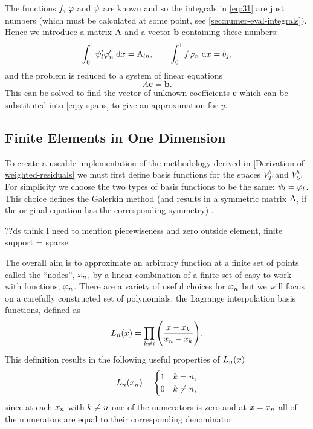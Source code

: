 The functions $f$, $\varphi$ and $\psi$ are known and so the integrals in \eqref{eq:31} are just numbers (which must be calculated at some point, see \autoref{sec:numer-eval-integrals}).
Hence we introduce a matrix $\mathrm{A}$ and a vector $\mathbf{b}$ containing these numbers:
\begin{equation}
  {\int_0^1  \psi_{l}'\varphi'_{n}  {\; \text{d}}{x}} =\mathrm{A}_{ln},\qquad{\int_0^1  f\varphi_{n}  {\; \text{d}}{x}} =b_{j},\label{eq:Aij_bj}
\end{equation}
and the problem is reduced to a system of linear equations
\begin{equation}
  A\mathbf{c} = \mathbf{b}.
  \label{eq:final_galerkin}
\end{equation}
This can be solved to find the vector of unknown coefficients $\mathbf{c}$ which can be substituted into \eqref{eq:y-spans} to give an approximation for $y$.


\subsection{Finite Elements in One Dimension}
\label{sub:Actual-Finite-Elements}

To create a useable implementation of the methodology derived in \autoref{Derivation-of-weighted-residuals} we must first define basis functions for the spaces $V_{T}^{h}$ and $V_S^h$.
For simplicity we choose the two types of basis functions to be the same: $\psi_l = \varphi_l$.
This choice defines the Galerkin method (and results in a symmetric matrix $\mathrm{A}$, if the original equation has the corresponding symmetry) \cite[215]{Zeinkiewicz1967}.

??ds think I need to mention piecewiseness and zero outside element, finite support = sparse

The overall aim is to approximate an arbitrary function at a finite set of points called the ``nodes'', $x_n$, by a linear combination of a finite set of easy-to-work-with functions, $\varphi_n$.
There are a variety of useful choices for $\varphi_n$ but we will focus on a carefully constructed set of polynomials: the Lagrange interpolation basis functions, defined as
\begin{equation}
  L_n(x)=\prod_{k\neq i}\Bigg(\dfrac{x-x_{k}}{x_n-x_{k}}\Bigg).
\end{equation}
This definition results in the following useful properties of $L_{n}(x)$
\begin{equation}
  \label{eq:35}
  L_{n}(x_{n}) =
  \begin{cases}
    1 & k = n, \\
    0 & k \neq n,
  \end{cases}
\end{equation}
since at each $x_{n}$ with $k \neq n$ one of the numerators is zero and at
$x = x_{n}$ all of the numerators are equal to their corresponding denominator.

